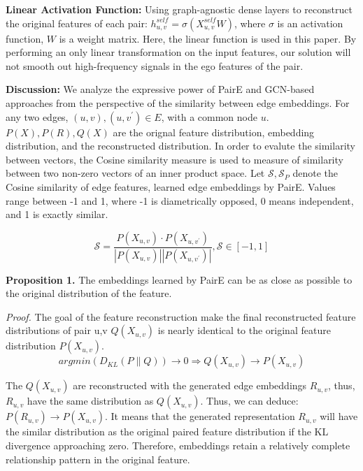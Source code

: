 \documentclass[10pt,journal,compsoc]{IEEEtran}
\begin{document}
\noindent\textbf{Linear Activation Function:} Using  graph-agnostic dense layers to reconstruct the original features of each pair: $h_{u,v}^{self} = \sigma(X_{u,v}^{self} W)$, where $\sigma$ is an activation function, $W$ is a weight matrix. Here, the linear function is used in this paper. By performing an only linear transformation on the input features, our solution will not smooth out high-frequency signals in the ego features of the pair. 




\noindent\textbf{Discussion:}  
We analyze the expressive power of PairE and GCN-based approaches from the perspective of the similarity between edge embeddings. For any two edges, $(u,v),(u,v^{'})\in E$, with a common node $u$. $P(X),P(R),Q(X)$ are the orignal feature distribution, embedding distribution, and the reconstructed distribution. In order to evalute the similarity between vectors, the Cosine similarity measure is used to measure of similarity between two non-zero vectors of an inner product space. Let $\mathcal{S},\mathcal{S}_{P}$ denote the Cosine similarity of edge features, learned edge embeddings by PairE. Values range between -1 and 1, where -1 is diametrically opposed, 0 means independent, and 1 is exactly similar.

$$\mathcal{S}=\frac{P(X_{u,v})\cdot P(X_{u,v^{'}})}{|P(X_{u,v})||P(X_{u,v^{'}})|}, \mathcal{S}\in[-1,1]$$







 

\noindent\textbf{Proposition 1.} The embeddings learned by PairE can be as close as possible to the original distribution of the feature. 







\noindent\textit{Proof.} The goal of the feature reconstruction make the final reconstructed feature distributions of pair u,v $Q(X_{u,v})$ is nearly identical to the original feature distribution $P(X_{u,v})$.
   $$ argmin(D_{KL}({P\parallel Q})) \rightarrow 0 \Rightarrow Q(X_{u,v}) \rightarrow P(X_{u,v}) $$
  
The $Q(X_{u,v})$ are reconstructed with the generated edge embeddings $R_{u,v}$, thus, $R_{u,v}$ have the same distribution as $Q(X_{u,v})$. Thus, we can deduce: $P(R_{u,v}) \rightarrow P(X_{u,v})$. It means that the generated representation $R_{u,v}$ will have the similar distribution as the original paired feature distribution if the KL divergence approaching zero. Therefore, embeddings retain a relatively complete relationship pattern in the original feature. 
\end{document}
